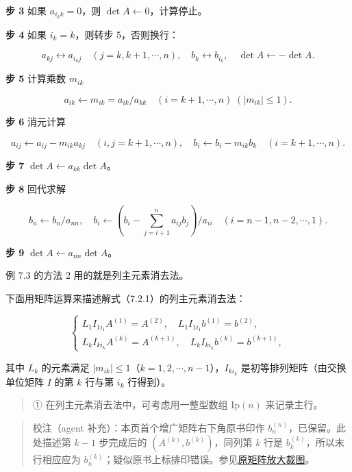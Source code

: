 \documentclass[
  10pt,
  fontset=fandol]{ctexart}
\begin{document}
\textbf{步 3} 如果 \(a_{i_kk}=0\)，则 \(\det A\leftarrow0\)，计算停止。

\textbf{步 4} 如果 \(i_k=k\)，则转步 5，否则换行：

\[a_{kj}\leftrightarrow a_{i_kj}\quad(j=k,k+1,\cdots,n),\quad b_k\leftrightarrow b_{i_k},\quad \det A\leftarrow-\det A.\]

\textbf{步 5} 计算乘数 \(m_{ik}\)

\[a_{ik}\leftarrow m_{ik}=a_{ik}/a_{kk}\quad(i=k+1,\cdots,n)\;(|m_{ik}|\le1).\]

\textbf{步 6} 消元计算

\[a_{ij}\leftarrow a_{ij}-m_{ik}a_{kj}\quad(i,j=k+1,\cdots,n),\quad b_i\leftarrow b_i-m_{ik}b_k\quad(i=k+1,\cdots,n).\]

\textbf{步 7} \(\det A\leftarrow a_{kk}\det A\)。

\textbf{步 8} 回代求解

\[b_n\leftarrow b_n/a_{nn},\quad b_i\leftarrow\left(b_i-\sum_{j=i+1}^{n}a_{ij}b_j\right)/a_{ii}\quad(i=n-1,n-2,\cdots,1).\]

\textbf{步 9} \(\det A\leftarrow a_{nn}\det A\)。

例 7.3 的方法 2 用的就是列主元素消去法。

下面用矩阵运算来描述解式（7.2.1）的列主元素消去法：

\[
\begin{cases}
L_1I_{1i_1}A^{(1)}=A^{(2)},\quad L_1I_{1i_1}b^{(1)}=b^{(2)},\\
L_kI_{ki_k}A^{(k)}=A^{(k+1)},\quad L_kI_{ki_k}b^{(k)}=b^{(k+1)},
\end{cases}
\tag{7.3.1}
\]

其中 \(L_k\) 的元素满足 \(|m_{ik}|\le1\)（\(k=1,2,\cdots,n-1\)），\(I_{ki_k}\) 是初等排列矩阵（由交换单位矩阵 \(I\) 的第 \(k\) 行与第 \(i_k\) 行得到）。

\begin{quote}
① 在列主元素消去法中，可考虑用一整型数组 \(\mathrm{Ip}(n)\) 来记录主行。
\end{quote}

\begin{quote}
校注（agent 补充）：本页首个增广矩阵右下角原书印作 \(b_n^{(n)}\)，已保留。此处描述第 \(k-1\) 步完成后的 \((A^{(k)},b^{(k)})\)，同列第 \(k\) 行是 \(b_k^{(k)}\)，所以末行相应应为 \(b_n^{(k)}\)；疑似原书上标排印错误。参见\href{../../../staging/ch07a/assets/pdf-187-rhs-detail.png}{原矩阵放大裁图}。
\end{quote}

\clearpage
\end{document}
